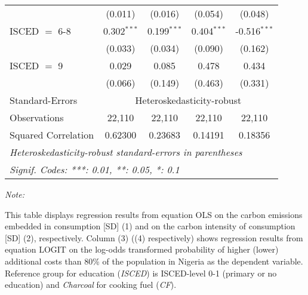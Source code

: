 \begin{table}[htbp!]
\begin{adjustbox}{width = 1\textwidth, max height = 0.95\textheight, center}
\begin{threeparttable}[b]
\begin{tabular}{lcccc}
                                 & (0.011)            & (0.016)            & (0.054)        & (0.048)\\   
            ISCED $=$ 6-8        & 0.302$^{***}$      & 0.199$^{***}$      & 0.404$^{***}$  & -0.516$^{***}$\\   
                                 & (0.033)            & (0.034)            & (0.090)        & (0.162)\\   
            ISCED $=$ 9          & 0.029              & 0.085              & 0.478          & 0.434\\   
                                 & (0.066)            & (0.149)            & (0.463)        & (0.331)\\   
            \midrule 
            Standard-Errors & \multicolumn{4}{c}{Heteroskedasticity-robust} \\ 
            Observations         & 22,110             & 22,110             & 22,110         & 22,110\\  
            Squared Correlation  & 0.62300            & 0.23683            & 0.14191        & 0.18356\\  
            \midrule \midrule
            \multicolumn{5}{l}{\emph{Heteroskedasticity-robust standard-errors in parentheses}}\\
            \multicolumn{5}{l}{\emph{Signif. Codes: ***: 0.01, **: 0.05, *: 0.1}}\\
         \end{tabular}
         
         \begin{tablenotes}\item \medskip \textit{Note:}
            \item This table displays regression results from equation OLS on the carbon emissions embedded in consumption [SD] (1) and on the carbon intensity of consumption [SD] (2), respectively. 
                                      Column (3) ((4) respectively) shows regression results from equation LOGIT on the log-odds transformed probability of higher (lower) additional costs than 80\% of the population in Nigeria as the dependent variable. Reference group for education (\textit{ISCED}) is ISCED-level 0-1 (primary or no education) and \textit{Charcoal} for cooking fuel (\textit{CF}).
         \end{tablenotes}
      \end{threeparttable}
   \end{adjustbox}
\end{table}


